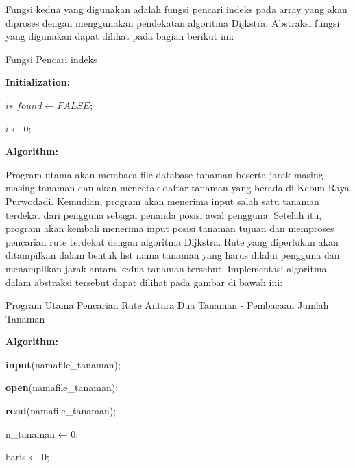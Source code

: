 \documentclass[conference]{IEEEtran}
\begin{document}
Fungsi kedua yang digunakan adalah fungsi pencari indeks
pada array yang akan diproses dengan menggunakan pendekatan algoritma Dijkstra. Abstraksi fungsi yang digunakan
dapat dilihat pada bagian berikut ini:

\begin{algorithm}
    \caption{Fungsi Pencari indeks}
    \textbf{Initialization:}
    
    $is\_found ← FALSE$;

    $i ← 0$;

    \textbf{Algorithm:}

\end{algorithm}

Program utama akan membaca file database tanaman
beserta jarak masing-masing tanaman dan akan mencetak
daftar tanaman yang berada di Kebun Raya Purwodadi.
Kemudian, program akan menerima input salah satu tanaman
terdekat dari pengguna sebagai penanda posisi awal pengguna.
Setelah itu, program akan kembali menerima input posisi
tanaman tujuan dan memproses pencarian rute terdekat dengan
algoritma Dijkstra. Rute yang diperlukan akan ditampilkan
dalam bentuk list nama tanaman yang harus dilalui pengguna
dan menampilkan jarak antara kedua tanaman tersebut.
Implementasi algoritma dalam abstraksi tersebut dapat dilihat
pada gambar di bawah ini:

\begin{algorithm}
    \caption{Program Utama Pencarian Rute Antara Dua Tanaman -
    Pembacaan Jumlah Tanaman}
    \textbf{Algorithm:}

    \textbf{input}(namafile\_tanaman);

    \textbf{open}(namafile\_tanaman);

    \textbf{read}(namafile\_tanaman);
    
    n\_tanaman ← 0;

    baris ← 0;

\end{algorithm}
\end{document}

